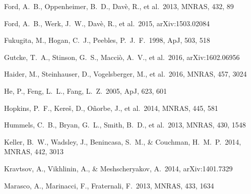 \documentclass[useAMS,usenatbib]{mn2e}
\def \apj {ApJ}
\def \mnras {MNRAS}
\begin{document}
\begin{thebibliography}{}

    

%
 Ford, A.~B., Oppenheimer, B.~D., Dav{\`e}, R., et al.\ 2013, \mnras, 432, 89

%
 Ford, A.~B., Werk, J.~W., Dav{\`e}, R., et al.\ 2015, arXiv:1503.02084

 Fukugita, M., Hogan, C.~J., Peebles, P.~J.~F.\ 1998, \apj, 503, 518


 Gutcke, T.~A., Stinson, G.~S., Macci{\`o}, A.~V., et al.\ 2016, arXiv:1602.06956



Haider, M., Steinhauser, D., Vogelsberger, M., et al.\ 2016, \mnras, 457, 3024

He, P., Feng, L.~L., Fang, L.~Z.\ 2005, \apj, 623, 601

 Hopkins, P.~F., Kere{\v s}, D., O{\~n}orbe, J., et al.\ 2014, \mnras, 445, 581 

%
 Hummels, C.~B., Bryan, G.~L., Smith, B.~D., et al.\ 2013, \mnras, 430, 1548




 Keller, B.~W., Wadsley, 
  J., Benincasa, S.~M., \& Couchman, H.~M.~P.\ 2014, \mnras, 442, 3013

 Kravtsov, A., 
Vikhlinin, A., \& Meshscheryakov, A.\ 2014, arXiv:1401.7329 

  



Marasco, A., Marinacci, F., Fraternali, F.\ 2013, \mnras, 433, 1634


\end{thebibliography}
\end{document}
